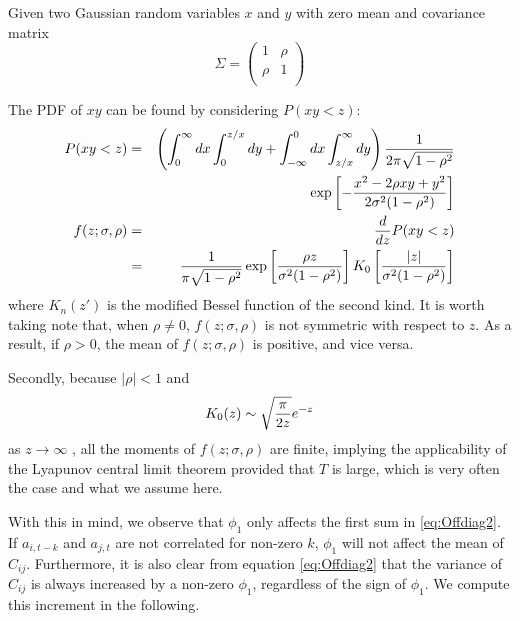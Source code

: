 Given two Gaussian random variables $x$ and $y$ with zero mean and
covariance matrix 
\begin{equation*}
  \Sigma =
  \begin{pmatrix}
    1 & \rho \\
    \rho & 1 \\
  \end{pmatrix}
\end{equation*}

The PDF of $xy$ can be found by considering $P(xy < z)$:
\begin{eqnarray*}
  P(xy < z) &=& \left(\int_0^\infty dx \int_0^{z/x} dy
    +\int_{-\infty}^0 dx \int_{z/x}^\infty dy \right)
    {1 \over 2\pi \sqrt{1 - \rho^2}} \\
    &&
    \exp\left[
      -{x^2 -2\rho xy + y^2
        \over
        2\sigma^2 (1 - \rho^2)} 
    \right] \\
  f(z; \sigma, \rho) &=& {d \over dz} P(xy < z)\\
  &=& {1 \over \pi \sqrt{1 - \rho^2}} \exp\left[
    {\rho z \over \sigma^2 (1 - \rho^2)}\right] K_0\left[
    {|z| \over \sigma^2 (1 - \rho^2)}
  \right]
\end{eqnarray*}
where $K_n(z')$ is the modified Bessel function of the second
kind. It is worth taking note that, when $\rho \neq 0$,
$f(z; \sigma, \rho)$ is not symmetric with respect to
$z$. As a result, if $\rho > 0$, the mean of $f(z;
\sigma, \rho)$ is positive, and vice versa.

Secondly, because $|\rho| < 1$ and
\begin{equation*}
  K_0(z) \sim \sqrt{\pi \over 2z} e^{-z}
\end{equation*}
as $z \to \infty$ \cite{Olver:2010:NHMF}, all the moments of
$f(z; \sigma, \rho)$ are finite, implying the
applicability of the Lyapunov central limit theorem provided that $T$
is large, which is very often the case and what we assume here.

With this in mind, we observe that $\phi_1$ only affects the first sum in
\ref{eq:Offdiag2}. If $a_{i,t-k}$ and $a_{j,t}$ are not correlated for
non-zero $k$, $\phi_1$ will not affect the mean of
$C_{ij}$. Furthermore, it is also clear from equation
\ref{eq:Offdiag2} that the variance of $C_{ij}$ is
always increased by a non-zero $\phi_1$, regardless of the sign of
$\phi_1$. We compute this increment in the following.


